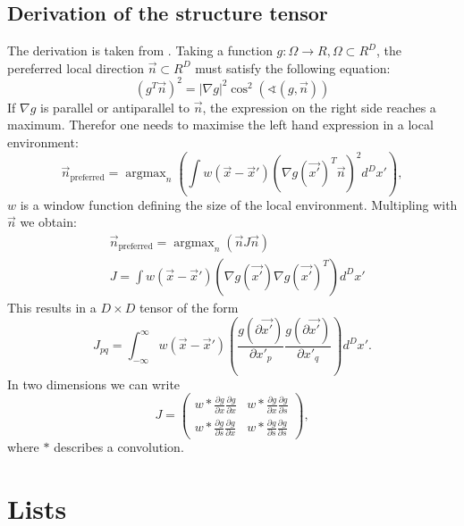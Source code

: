 \documentclass  [
  paper    = a4,
  BCOR     = 10mm,
  twoside,
  fontsize = 12pt,
  fleqn,
  toc      = bibnumbered,
  toc      = listofnumbered,
  numbers  = noendperiod,
  headings = normal,
  listof   = leveldown,
  version  = 3.03
]                                       {scrreprt}
\DeclareMathOperator*{\argmax}{argmax}
\begin{document}
\begin{appendix}
  	\section{Derivation of the structure tensor}
  	The derivation is taken from \cite{jahne2013digitale}. Taking a function $g:\Omega\rightarrow \!R, \Omega \subset \!R^D$, the pereferred local direction $\vec{n} \subset \!R^D$ must satisfy the following equation:
  	\begin{equation}\label{key}
  	( g^T\vec{n})^2 = |\nabla g |^2 \cos^2(\sphericalangle (g, \vec{n}))
  	\end{equation}
  	If $\nabla g$ is parallel or antiparallel to $\vec{n}$, the expression on the right side reaches a maximum. Therefor one needs to maximise the left hand expression in a local environment:
  	\begin{equation}\label{key}
  	\vec n_\text{preferred} = \argmax_n\left(\int w(\vec x - \vec x')\left(\nabla g(\vec{x'})^T \vec{n}\right)^2d^Dx' \right),
  	\end{equation}
  	$w$ is a window function defining the size of the local environment. Multipling with $\vec{n}$
  	we obtain:
  	\begin{align}\label{key}
  	&\vec n_\text{preferred} = \argmax_n\left(\vec n  J \vec n \right)\\
  	& J = \int w(\vec x - \vec x')\left(\nabla g(\vec{x'}) \nabla g(\vec{x'})^T\right)d^Dx'
  	\end{align}
  	This results in a $D\times D $ tensor of the form
  	\begin{equation}\label{key}
  	J_{pq} = \int_{-\infty}^{\infty} w(\vec x - \vec x')\left(\frac{g(\partial\vec{x'})}{\partial x'_p} \frac{g(\partial\vec{x'})}{\partial x'_q}\right)d^Dx'.
  	\end{equation}
  	In two dimensions we can write
	\begin{equation}\label{key}
	J =\left(
	\begin{matrix}
	w*\frac{\partial g}{\partial x}\frac{\partial g}{\partial x} & w*\frac{\partial g}{\partial x}\frac{\partial g}{\partial s} \\
	w*\frac{\partial g}{\partial s}\frac{\partial g}{\partial x} & w*\frac{\partial g}{\partial s}\frac{\partial g}{\partial s} 
	\end{matrix}\right),
	\end{equation}  
	where \glqq $*$ \grqq describes a convolution.	
  	
  	
    \chapter{Lists}
    \listoffigures
    \listoftables
    {}
    
    
  \end{appendix}
\end{document}
